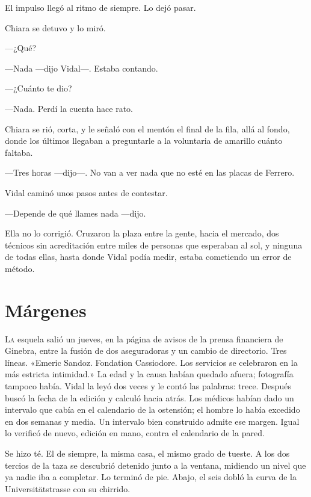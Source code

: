 El impulso llegó al ritmo de siempre. Lo dejó pasar.

Chiara se detuvo y lo miró.

---¿Qué?

---Nada ---dijo Vidal---. Estaba contando.

---¿Cuánto te dio?

---Nada. Perdí la cuenta hace rato.

Chiara se rió, corta, y le señaló con el mentón el final de la fila, allá al fondo, donde los últimos llegaban a preguntarle a la voluntaria de amarillo cuánto faltaba.

---Tres horas ---dijo---. No van a ver nada que no esté en las placas de Ferrero.

Vidal caminó unos pasos antes de contestar.

---Depende de qué llames nada ---dijo.

Ella no lo corrigió. Cruzaron la plaza entre la gente, hacia el mercado, dos técnicos sin acreditación entre miles de personas que esperaban al sol, y ninguna de todas ellas, hasta donde Vidal podía medir, estaba cometiendo un error de método.

\clearpage

\chapter{Márgenes}

\lettrine[lines=2, lhang=0.1, nindent=0.2em]{L}{a} esquela salió un jueves, en la página de avisos de la prensa financiera de Ginebra, entre la fusión de dos aseguradoras y un cambio de directorio. Tres líneas. «Emeric Sandoz. Fondation Cassiodore. Los servicios se celebraron en la más estricta intimidad.» La edad y la causa habían quedado afuera; fotografía tampoco había. Vidal la leyó dos veces y le contó las palabras: trece. Después buscó la fecha de la edición y calculó hacia atrás. Los médicos habían dado un intervalo que cabía en el calendario de la ostensión; el hombre lo había excedido en dos semanas y media. Un intervalo bien construido admite ese margen. Igual lo verificó de nuevo, edición en mano, contra el calendario de la pared.


Se hizo té. El de siempre, la misma casa, el mismo grado de tueste. A los dos tercios de la taza se descubrió detenido junto a la ventana, midiendo un nivel que ya nadie iba a completar. Lo terminó de pie. Abajo, el seis dobló la curva de la Universitätstrasse con su chirrido.

